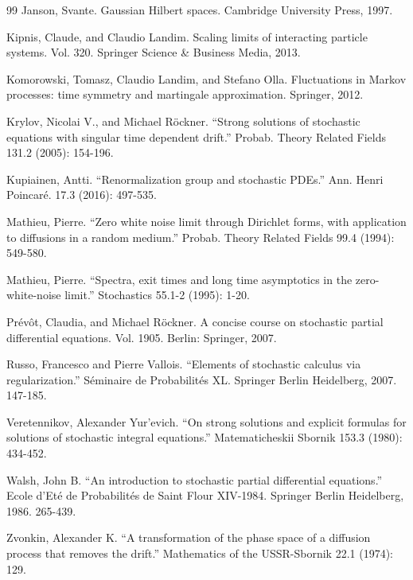 \documentclass[a4paper,11pt]{article}
\newcommand{\1}{\mathds{1}}
\begin{document}
\begin{thebibliography}{99}
     Janson, Svante. Gaussian Hilbert spaces. Cambridge University Press, 1997.

     Kipnis, Claude, and Claudio Landim. Scaling limits of interacting particle systems. Vol. 320. Springer Science \& Business Media, 2013.

    Komorowski, Tomasz, Claudio Landim, and Stefano Olla. Fluctuations in
    Markov processes: time symmetry and martingale approximation. Springer, 2012.
    
      Krylov, Nicolai V., and Michael R\"ockner. ``Strong solutions of stochastic equations with singular time dependent drift.'' Probab. Theory Related Fields 131.2 (2005): 154-196.
    
    Kupiainen, Antti. ``Renormalization group and stochastic PDEs.'' Ann. Henri Poincar\'e. 17.3 (2016): 497-535.
    
    Mathieu, Pierre. ``Zero white noise limit through Dirichlet forms, with application to diffusions in a random medium.'' Probab. Theory Related Fields 99.4 (1994): 549-580.
    
     Mathieu, Pierre. ``Spectra, exit times and long time asymptotics in the zero-white-noise limit.'' Stochastics 55.1-2 (1995): 1-20.
    
     Pr\'ev\^ot, Claudia, and Michael R\"ockner. A concise course on stochastic partial differential equations. Vol. 1905. Berlin: Springer, 2007.
    
    Russo, Francesco and Pierre Vallois. ``Elements of stochastic calculus via regularization.'' S\'eminaire de Probabilit\'es XL. Springer Berlin Heidelberg, 2007. 147-185.
    
     Veretennikov, Alexander Yur'evich. ``On strong solutions and explicit formulas for solutions of stochastic integral equations.'' Matematicheskii Sbornik 153.3 (1980): 434-452.
     
     Walsh, John B. ``An introduction to stochastic partial differential equations.'' Ecole d'Et\'e de Probabilit\'es de Saint Flour XIV-1984. Springer Berlin Heidelberg, 1986. 265-439.
    
     Zvonkin, Alexander K. ``A transformation of the phase space of a diffusion process that removes the drift.'' Mathematics of the USSR-Sbornik 22.1 (1974): 129.

\end{thebibliography}
\end{document}
